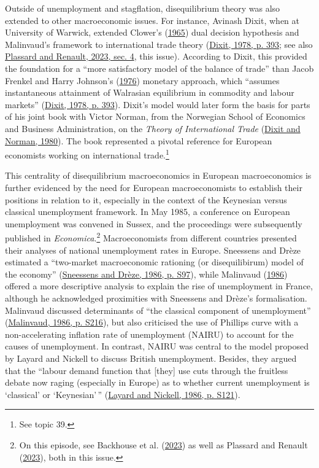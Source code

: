 \documentclass[
  12pt,
  onecolumn]{article}
\begin{document}
Outside of unemployment and stagflation, disequilibrium theory was also extended to other macroeconomic issues. For instance, Avinash Dixit, when at University of Warwick, extended Clower's (\protect\hyperlink{ref-clower1965}{1965}) dual decision hypothesis and Malinvaud's framework to international trade theory (\protect\hyperlink{ref-dixit1978}{Dixit, 1978, p. 393}; see also \protect\hyperlink{ref-plassard2023}{Plassard and Renault, 2023, sec. 4}, this issue). According to Dixit, this provided the foundation for a ``more satisfactory model of the balance of trade'' than Jacob Frenkel and Harry Johnson's (\protect\hyperlink{ref-frenkel1976}{1976}) monetary approach, which ``assumes instantaneous attainment of Walrasian equilibrium in commodity and labour markets'' (\protect\hyperlink{ref-dixit1978}{Dixit, 1978, p. 393}). Dixit's model would later form the basis for parts of his joint book with Victor Norman, from the Norwegian School of Economics and Business Administration, on the \emph{Theory of International Trade} (\protect\hyperlink{ref-dixit1980}{Dixit and Norman, 1980}). The book represented a pivotal reference for European economists working on international trade.\footnote{See topic 39.}

This centrality of disequilibrium macroeconomics in European macroeconomics is further evidenced by the need for European macroeconomists to establish their positions in relation to it, especially in the context of the Keynesian versus classical unemployment framework. In May 1985, a conference on European unemployment was convened in Sussex, and the proceedings were subsequently published in \emph{Economica}.\footnote{On this episode, see Backhouse et al. (\protect\hyperlink{ref-backhouse2023}{2023}) as well as Plassard and Renault (\protect\hyperlink{ref-plassard2023}{2023}), both in this issue.} Macroeconomists from different countries presented their analyses of national unemployment rates in Europe. Sneessens and Drèze estimated a ``two-market macroeconomic rationing (or disequilibirum) model of the economy'' (\protect\hyperlink{ref-sneessens1986}{Sneessens and Drèze, 1986, p. S97}), while Malinvaud (\protect\hyperlink{ref-malinvaud1986}{1986}) offered a more descriptive analysis to explain the rise of unemployment in France, although he acknowledged proximities with Sneessens and Drèze's formalisation. Malinvaud discussed determinants of ``the classical component of unemployment'' (\protect\hyperlink{ref-malinvaud1986}{Malinvaud, 1986, p. S216}), but also criticised the use of Phillips curve with a non-accelerating inflation rate of unemployment (NAIRU) to account for the causes of unemployment. In contrast, NAIRU was central to the model proposed by Layard and Nickell to discuss British unemployment. Besides, they argued that the ``labour demand function that {[}they{]} use cuts through the fruitless debate now raging (especially in Europe) as to whether current unemployment is `classical' or `Keynesian'\,'' (\protect\hyperlink{ref-layard1986}{Layard and Nickell, 1986, p. S121}).
\end{document}
